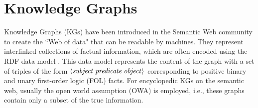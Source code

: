 \section{Knowledge Graphs}
\label{sec:kgs}

Knowledge Graphs (KGs) have been introduced in the Semantic Web community to create the ``Web of data" that can be readable by machines. They represent interlinked collections of factual information, which are often encoded using the RDF data model \cite{rdf2004}. This data model represents the content of the graph with a set of triples of the form $\langle\mathit{subject\;predicate\;object}\rangle$ corresponding to positive binary and unary first-order logic (FOL) facts. For encyclopedic KGs on the semantic web, usually the open world assumption (OWA) is employed, i.e., these graphs contain only a subset of the true information. %

